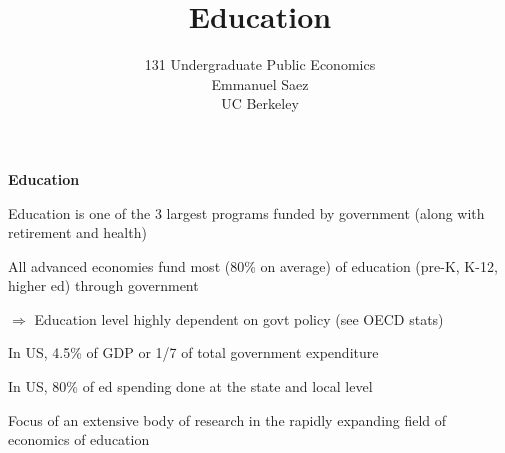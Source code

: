\documentclass[landscape]{slides}
\author{131 Undergraduate Public Economics \\ Emmanuel Saez \\ UC Berkeley}
\date{}
\title{Education} \onlyslides{1-300}
\begin{document}
\begin{slide}
\maketitle
\end{slide}

%
%
%
%
%
%


%

\begin{slide}
\begin{center}
{\bf Education}
\end{center}

Education is one of the 3 largest programs funded by government
(along with retirement and health)

All advanced economies fund most (80\% on average) of education  (pre-K, K-12, higher ed) through government

$\Rightarrow$ Education level highly dependent on govt policy (see OECD stats)

In US, 4.5\% of GDP or 1/7 of total government expenditure 

In US, 80\% of ed spending done at the state and local level

Focus of an extensive body of research in the rapidly expanding field of economics of education
\end{slide}

\begin{slide}

\end{slide}

\begin{slide}

\end{slide}
\end{document}
